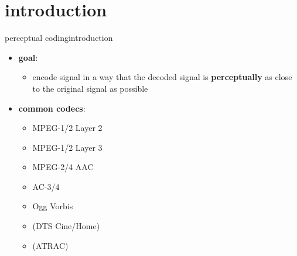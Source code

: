 



\subtitle{Part 26: Perceptual Coding}


	

\section[intro]{introduction}

	\begin{frame}{perceptual coding}{introduction}
        \begin{itemize}
            \item   \textbf{goal}: 
                \begin{itemize}
                    \item   encode signal in a way that the decoded signal is \textbf{perceptually} as close to the original signal as possible
                \end{itemize}
            \pause
            \bigskip
            \item   \textbf{common codecs}:
                \begin{itemize}
                    \item   MPEG-1/2 Layer 2
                    \item   MPEG-1/2 Layer 3
                    \item   %
                    MPEG-2/4 AAC
                    \item   AC-3/4
                    \item   Ogg Vorbis
                    \item   (DTS  Cine/Home)
                    \item   (ATRAC)
                \end{itemize}
        \end{itemize}
	\end{frame}
